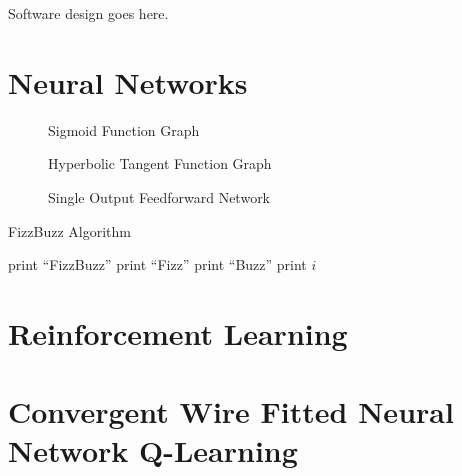Software design goes here.

\section{Neural Networks}

\begin{figure}
	\centering
	
	\caption{Sigmoid Function Graph}
\end{figure}

\begin{figure}[h]
	\centering
	
	\caption{Hyperbolic Tangent Function Graph}
\end{figure}

\begin{figure}[h]
	\centering
	
	\caption{Single Output Feedforward Network}
\end{figure}

\begin{algorithm}[!ht]
	\caption{FizzBuzz Algorithm}
	\begin{algorithmic}[1]
				\State print ``FizzBuzz''
				\State print ``Fizz''
				\State print ``Buzz''
			\Else
				\State print $i$
			\EndIf
		\EndFor
	\end{algorithmic}
\end{algorithm}

\section{Reinforcement Learning}

\section{Convergent Wire Fitted Neural Network Q-Learning}
